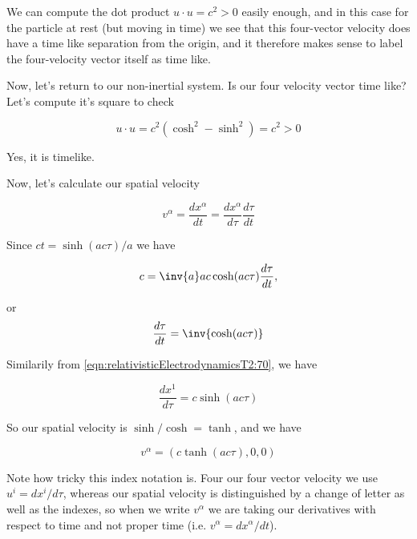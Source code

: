 We can compute the dot product $u \cdot u = c^2 > 0$ easily enough, and in this case for the particle at rest (but moving in time) we see that this four-vector velocity does have a time like separation from the origin, and it therefore makes sense to label the four-velocity vector itself as time like.

Now, let's return to our non-inertial system.  Is our four velocity vector time like?  Let's compute it's square to check

\begin{equation}\label{eqn:relativisticElectrodynamicsT2:90}
u \cdot u = c^2 ( \cosh^2 - \sinh^2 ) = c^2 > 0
\end{equation}

Yes, it is timelike.

Now, let's calculate our spatial velocity

\begin{equation}\label{eqn:relativisticElectrodynamicsT2:100}
v^\alpha
= \frac{dx^\alpha}{dt}
=
\frac{dx^\alpha}{d\tau} \frac{d\tau}{dt}
\end{equation}

Since $ct = \sinh( a c \tau )/a$ we have

\begin{equation}\label{eqn:relativisticElectrodynamicsT2:110}
c = \inv{a} a c \cosh( a c \tau ) \frac{d\tau}{dt},
\end{equation}

or
\begin{equation}\label{eqn:relativisticElectrodynamicsT2:110b}
\frac{d\tau}{dt} = \inv{\cosh( a c \tau) }
\end{equation}

Similarily from \ref{eqn:relativisticElectrodynamicsT2:70}, we have

\begin{equation}\label{eqn:relativisticElectrodynamicsT2:120}
\frac{dx^1}{d\tau} = c \sinh( a c \tau )
\end{equation}

So our spatial velocity is $\sinh/\cosh = \tanh$, and we have

\begin{equation}\label{eqn:relativisticElectrodynamicsT2:130}
v^\alpha = (c \tanh( a c \tau), 0, 0)
\end{equation}

Note how tricky this index notation is.  Four our four vector velocity we use $u^i = dx^i/d\tau$, whereas our spatial velocity is distinguished by a change of letter as well as the indexes, so when we write $v^\alpha$ we are taking our derivatives with respect to time and not proper time (i.e. $v^\alpha = dx^\alpha/dt$).

